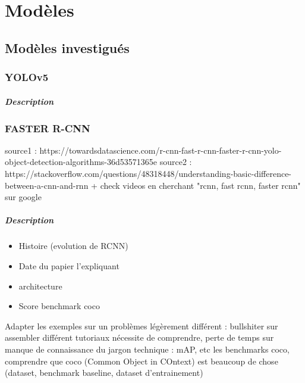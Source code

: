 \chapter{Modèles}

\section{Modèles investigués}

\subsection{YOLOv5}
\paragraph{Description}

\subsection{FASTER R-CNN}

source1 : https://towardsdatascience.com/r-cnn-fast-r-cnn-faster-r-cnn-yolo-object-detection-algorithms-36d53571365e \newline\newline
source2 : https://stackoverflow.com/questions/48318448/understanding-basic-difference-between-a-cnn-and-rnn \newline\newline
+ check videos en cherchant "rcnn, fast rcnn, faster rcnn" sur google






\paragraph{Description}





\begin{itemize}
    \item Histoire (evolution de RCNN) 
    \item Date du papier l’expliquant 
    \item architecture
    \item Score benchmark coco
\end{itemize}
Adapter les exemples sur un problèmes légèrement différent : bullshiter sur assembler différent tutoriaux nécessite de comprendre, perte de temps sur manque de connaissance du jargon technique : mAP, etc les benchmarks coco, comprendre que coco (Common Object in COntext) est beaucoup de chose (dataset, benchmark baseline, dataset d’entrainement)





